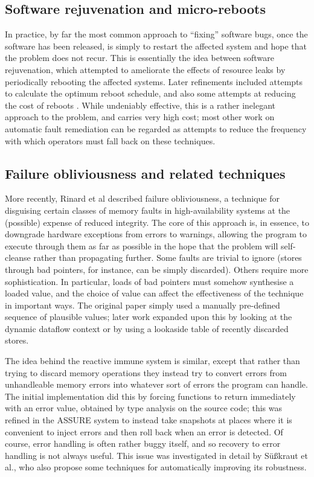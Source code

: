 \subsection{Software rejuvenation and micro-reboots}

In practice, by far the most common approach to ``fixing'' software
bugs, once the software has been released, is simply to restart the
affected system and hope that the problem does not recur.  This is
essentially the idea between software rejuvenation\cite{Huang1995},
which attempted to ameliorate the effects of resource leaks by
periodically rebooting the affected systems.  Later refinements
included attempts to calculate the optimum reboot
schedule\cite{Garg1998,Li2002,Vaidyanathan2001}, and also some
attempts at reducing the cost of reboots
\cite{Candea2002,Patterson2002}.  While undeniably effective, this is
a rather inelegant approach to the problem, and carries very high
cost; most other work on automatic fault remediation can be regarded
as attempts to reduce the frequency with which operators must fall
back on these techniques.

\subsection{Failure obliviousness and related techniques}
More recently, Rinard et al\cite{Rinard2004} described failure
obliviousness, a technique for disguising certain classes of memory
faults in high-availability systems at the (possible) expense of
reduced integrity.  The core of this approach is, in essence, to
downgrade hardware exceptions from errors to warnings, allowing the
program to execute through them as far as possible in the hope that
the problem will self-cleanse rather than propagating further.  Some
faults are trivial to ignore (stores through bad pointers, for
instance, can be simply discarded).  Others require more
sophistication.  In particular, loads of bad pointers must somehow
synthesise a loaded value, and the choice of value can affect the
effectiveness of the technique in important ways.  The original paper
simply used a manually pre-defined sequence of plausible values; later
work expanded upon this by looking at the dynamic dataflow
context\cite{Nagarajan2009} or by using a lookaside table of recently
discarded stores\cite{Rinard2005a}.

The idea behind the reactive immune system\cite{Sidiroglou2005} is
similar, except that rather than trying to discard memory operations
they instead try to convert errors from unhandleable memory errors
into whatever sort of errors the program can handle.  The initial
implementation did this by forcing functions to return immediately
with an error value, obtained by type analysis on the source code;
this was refined in the ASSURE system\cite{Sidiroglou2009} to instead
take snapshots at places where it is convenient to inject errors and
then roll back when an error is detected.  Of course, error handling
is often rather buggy itself, and so recovery to error handling is not
always useful.  This issue was investigated in detail by
S\"{u}\ss{}kraut et al.\cite{Susskraut2006}, who also propose some
techniques for automatically improving its robustness.

